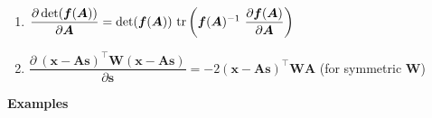 \vspace{0.5cm}
\begin{enumerate}[resume*=vcalrules]
    \item $
        \dfrac{\partial \det(\bm{f}(\bm{A}))}{\partial \bm{A}}
        = \det(\bm{f}(\bm{A}))\ \tr\dParenBrac{\bm{f}(\bm{A})^{-1}\ \dfrac{\partial \bm{f}(\bm{A})}{\partial \bm{A}}}
    $
    \hfill \cite{mfml/book/mml/Deisenroth-Faisal-Ong}

    \item
    $
        \dfrac{\partial\ (\bm{x} - \bm{As})^\top \bm{W} (\bm{x} - \bm{As})}{\partial\bm{s}}
        = -2(\bm{x} - \bm{As})^\top \bm{WA}
    $
    \hfill
    (for symmetric $\bm{W}$)
    \hfill \cite{mfml/book/mml/Deisenroth-Faisal-Ong}
\end{enumerate}


\vspace{0.5cm}
\textbf{Examples}
